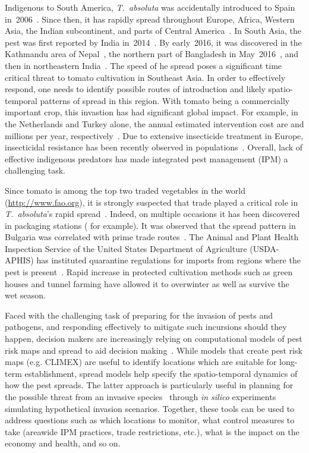 \documentclass[11pt]{article}
\newcommand{\tuta}{\emph{T.~absoluta}}
\theoremstyle{definition}
\begin{document}
Indigenous to South America, \tuta{} was accidentally introduced to Spain
in~2006~\cite{desneux2010biological,biondi2017}. Since then, it has rapidly
spread throughout Europe, Africa, Western Asia, the Indian subcontinent,
and parts of Central America~\cite{campos2017western}. In South Asia, the
pest was first reported by India
in~2014~\cite{sridhar2014new,kalleshwaraswamy2015occurrence}.  By
early~2016, it was discovered in the Kathmandu area of
Nepal~\cite{bajracharya2016first}, the northern part of Bangladesh in
May~2016~\cite{hossain2016first}, and then in northeastern
India~\cite{sankarganesh2017}.  The speed of he spread poses a significant time critical
threat to tomato cultivation in Southeast Asia. In order to effectively respond,
one needs to identify possible routes of introduction and likely
spatio-temporal patterns of spread in this region.  With tomato being a
commercially important crop, this invastion has had significant global
impact.  For example, in the Netherlands and Turkey alone, the annual
estimated intervention cost are  and  millions per year,
respectively~\cite{potting2013tuta,oztemiz2014tuta}. Due to extensive
insecticide treatment in Europe, insecticidal resistance has been recently
observed in populations~\cite{guedes2013tomato}. Overall, lack of effective
indigenous predators has made integrated pest management (IPM) a
challenging task.

Since tomato is among the top two traded vegetables in the world (\url{http://www.fao.org}),
it is strongly suspected that trade played a critical role in \tuta{}'s
rapid spread~\cite{campos2017western}. Indeed, on multiple occasions it has
been discovered in packaging stations (\cite{eppo105} for example). It was
observed that the spread pattern in Bulgaria was correlated with prime
trade routes~\cite{karadjova2013tuta}.  The Animal and Plant Health
Inspection Service of the United States Department of Agriculture
(USDA-APHIS) has instituted quarantine regulations for imports from regions
where the pest is present~\cite{USDA2012}. Rapid increase in protected
cultivation methods such as green houses and tunnel farming have allowed it
to overwinter as well as survive the wet season.

Faced with the challenging task of preparing for the invasion of 
pests and pathogens, and responding effectively to mitigate such incursions
should they happen, decision makers are increasingly relying on  computational
models of pest risk maps and spread to aid decision making~\cite{venette2010}.
While models that create pest risk maps (e.g. CLIMEX) are useful to
identify locations which are suitable for long-term establishment, %
spread models help specify the spatio-temporal
dynamics of how the pest spreads.  The latter approach is particularly useful in planning
for the possible threat from an invasive
species~\cite{perrings2014merging,barbier2013implementing,paini2010threat,paini2010threat,paini2016global}
through {\it in silico} experiments simulating
hypothetical invasion scenarios. Together, these tools can be used to
address questions such as which locations to monitor, what control measures
to take (areawide IPM practices, trade restrictions, etc.), what is the
impact on the economy and health, and so on.
\end{document}

